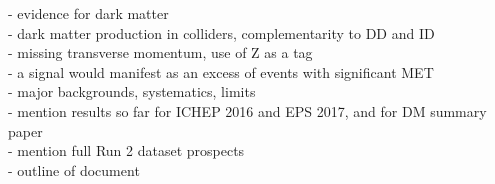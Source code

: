 \label{chapter:introduction}

- evidence for dark matter\\
- dark matter production in colliders, complementarity to DD and ID\\
- missing transverse momentum, use of Z as a tag\\
- a signal would manifest as an excess of events with significant MET\\
- major backgrounds, systematics, limits\\
- mention results so far for ICHEP 2016 and EPS 2017, and for DM summary paper\\
- mention full Run 2 dataset prospects\\
- outline of document\\